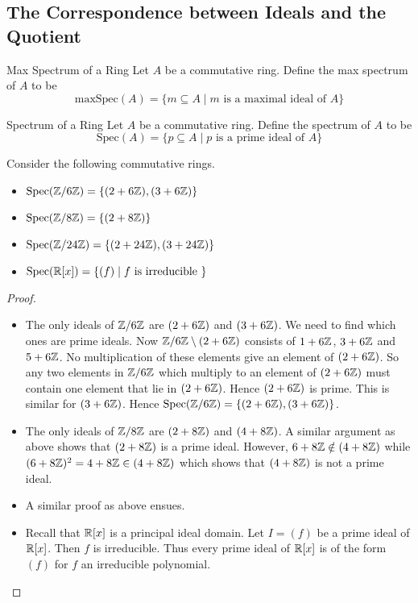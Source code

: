 \documentclass[a4paper]{article}
\begin{document}
\subsection{The Correspondence between Ideals and the Quotient}
\begin{defn}{Max Spectrum of a Ring}{} Let $A$ be a commutative ring. Define the max spectrum of $A$ to be $$\text{maxSpec}(A)=\{m\subseteq A\;|\;m\text{ is a maximal ideal of }A\}$$
\end{defn}

\begin{defn}{Spectrum of a Ring}{} Let $A$ be a commutative ring. Define the spectrum of $A$ to be $$\text{Spec}(A)=\{p\subseteq A\;|\;p\text{ is a prime ideal of }A\}$$
\end{defn}

\begin{eg}{}{} Consider the following commutative rings. 
\begin{itemize}
\item $\text{Spec}(\mathbb{Z}/6\mathbb{Z})=\{(2+6\mathbb{Z}),(3+6\mathbb{Z})\}$
\item $\text{Spec}(\mathbb{Z}/8\mathbb{Z})=\{(2+8\mathbb{Z})\}$
\item $\text{Spec}(\mathbb{Z}/24\mathbb{Z})=\{(2+24\mathbb{Z}),(3+24\mathbb{Z})\}$
\item $\text{Spec}(\mathbb{R}[x])=\{(f)\;|\;f\text{ is irreducible }\}$
\end{itemize} 
\begin{proof}~\\
\begin{itemize}
\item The only ideals of $\mathbb{Z}/6\mathbb{Z}$ are $(2+6\mathbb{Z})$ and $(3+6\mathbb{Z})$. We need to find which ones are prime ideals. Now $\mathbb{Z}/6\mathbb{Z}\setminus(2+6\mathbb{Z})$ consists of $1+6\mathbb{Z}$, $3+6\mathbb{Z}$ and $5+6\mathbb{Z}$. No multiplication of these elements give an element of $(2+6\mathbb{Z})$. So any two elements in $\mathbb{Z}/6\mathbb{Z}$ which multiply to an element of $(2+6\mathbb{Z})$ must contain one element that lie in $(2+6\mathbb{Z})$. Hence $(2+6\mathbb{Z})$ is prime. This is similar for $(3+6\mathbb{Z})$. Hence $\text{Spec}(\mathbb{Z}/6\mathbb{Z})=\{(2+6\mathbb{Z}),(3+6\mathbb{Z})\}$. 
\item The only ideals of $\mathbb{Z}/8\mathbb{Z}$ are $(2+8\mathbb{Z})$ and $(4+8\mathbb{Z})$. A similar argument as above shows that $(2+8\mathbb{Z})$ is a prime ideal. However, $6+8\mathbb{Z}\notin(4+8\mathbb{Z})$ while $(6+8\mathbb{Z})^2=4+8\mathbb{Z}\in(4+8\mathbb{Z})$ which shows that $(4+8\mathbb{Z})$ is not a prime ideal. 
\item A similar proof as above ensues. 
\item Recall that $\mathbb{R}[x]$ is a principal ideal domain. Let $I=(f)$ be a prime ideal of $\mathbb{R}[x]$. Then $f$ is irreducible. Thus every prime ideal of $\mathbb{R}[x]$ is of the form $(f)$ for $f$ an irreducible polynomial. 
\end{itemize}
\end{proof}
\end{eg}
\end{document}
